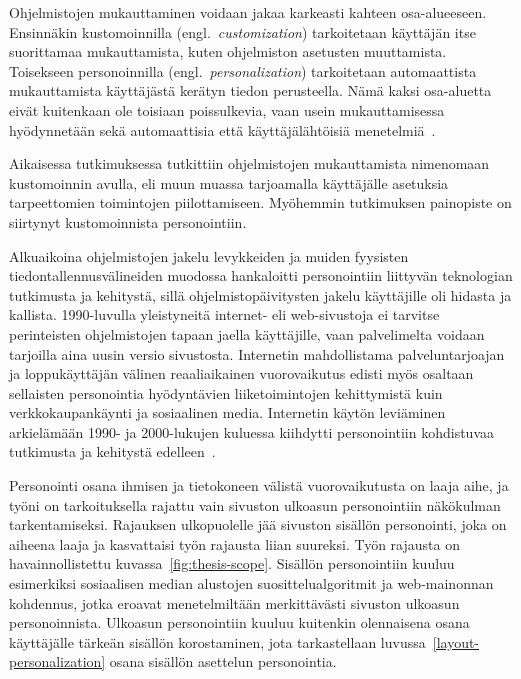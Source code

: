 \documentclass[finnish, 12pt, a4paper, elec, utf8, a-1b, online]{aaltothesis}
\begin{document}
Ohjelmistojen mukauttaminen voidaan jakaa karkeasti kahteen osa-alueeseen.
Ensinnäkin kustomoinnilla (engl.~\textit{customization}) tarkoitetaan käyttäjän
itse suorittamaa mukauttamista, kuten ohjelmiston asetusten muuttamista.
Toisekseen personoinnilla (engl.~\textit{personalization}) tarkoitetaan
automaattista mukauttamista käyttäjästä kerätyn tiedon perusteella. Nämä kaksi
osa-aluetta eivät kuitenkaan ole toisiaan poissulkevia, vaan usein
mukauttamisessa hyödynnetään sekä automaattisia että käyttäjälähtöisiä
menetelmiä~\cite{10.1145/633292.633483}.

Aikaisessa tutkimuksessa tutkittiin ohjelmistojen mukauttamista nimenomaan
kustomoinnin avulla, eli muun muassa tarjoamalla käyttäjälle asetuksia
tarpeettomien toimintojen piilottamiseen. Myöhemmin tutkimuksen painopiste on
siirtynyt kustomoinnista personointiin.

Alkuaikoina ohjelmistojen jakelu levykkeiden ja muiden fyysisten
tiedontallennusvälineiden muodossa hankaloitti personointiin liittyvän
teknologian tutkimusta ja kehitystä, sillä ohjelmistopäivitysten jakelu
käyttäjille oli hidasta ja kallista. 1990-luvulla yleistyneitä internet- eli
web-sivustoja ei tarvitse perinteisten ohjelmistojen tapaan jaella käyttäjille,
vaan palvelimelta voidaan tarjoilla aina uusin versio sivustosta. Internetin
mahdollistama palveluntarjoajan ja loppukäyttäjän välinen reaaliaikainen
vuorovaikutus edisti myös osaltaan sellaisten personointia hyödyntävien
liiketoimintojen kehittymistä kuin verkkokaupankäynti ja sosiaalinen media.
Internetin käytön leviäminen arkielämään 1990- ja 2000-lukujen kuluessa
kiihdytti personointiin kohdistuvaa tutkimusta ja kehitystä
edelleen~\cite{10.1108/03090560710737534}.

Personointi osana ihmisen ja tietokoneen välistä vuorovaikutusta on laaja aihe,
ja työni on tarkoituksella rajattu vain sivuston ulkoasun personointiin
näkökulman tarkentamiseksi. Rajauksen ulkopuolelle jää sivuston sisällön
personointi, joka on aiheena laaja ja kasvattaisi työn rajausta liian suureksi.
Työn rajausta on havainnollistettu kuvassa~\ref{fig:thesis-scope}. Sisällön
personointiin kuuluu esimerkiksi sosiaalisen median alustojen
suosittelualgoritmit ja web-mainonnan kohdennus, jotka eroavat menetelmiltään
merkittävästi sivuston ulkoasun personoinnista. Ulkoasun personointiin kuuluu
kuitenkin olennaisena osana käyttäjälle tärkeän sisällön korostaminen, jota
tarkastellaan luvussa~\ref{layout-personalization} osana sisällön asettelun
personointia.
\end{document}
